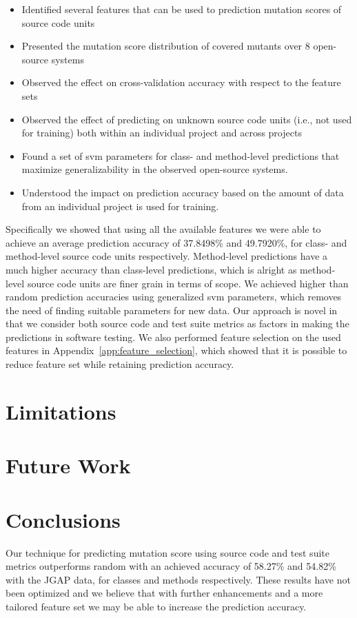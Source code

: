 \begin{itemize}
	\item Identified several features that can be used to prediction mutation scores of source code units
	\item Presented the mutation score distribution of covered mutants over 8 open-source systems
	\item Observed the effect on cross-validation accuracy with respect to the feature sets
	\item Observed the effect of predicting on unknown source code units (i.e., not used for training) both within an individual project and across projects
	\item Found a set of \gls{svm} parameters for class- and method-level predictions that maximize generalizability in the observed open-source systems.
	\item Understood the impact on prediction accuracy based on the amount of data from an individual project is used for training.
\end{itemize}

Specifically we showed that using all the available features we were able to achieve an average prediction accuracy of 37.8498\% and 49.7920\%, for class- and method-level source code units respectively. Method-level predictions have a much higher accuracy than class-level predictions, which is alright as method-level source code units are finer grain in terms of scope. We achieved higher than random prediction accuracies using generalized \gls{svm} parameters, which removes the need of finding suitable parameters for new data. Our approach is novel in that we consider both source code and test suite metrics as factors in making the predictions in software testing. We also performed feature selection on the used features in Appendix~\ref{app:feature_selection}, which showed that it is possible to reduce feature set while retaining prediction accuracy.


\section{Limitations}
\label{sec:conclusions_limitations}


\section{Future Work}
\label{sec:conclusions_future_work}


\section{Conclusions}
\label{sec:conclusions_conclusions}
Our technique for predicting mutation score using source code and test suite metrics outperforms random with an achieved accuracy of 58.27\% and 54.82\% with the JGAP data, for classes and methods respectively. These results have not been optimized and we believe that with further enhancements and a more tailored feature set we may be able to increase the prediction accuracy.

